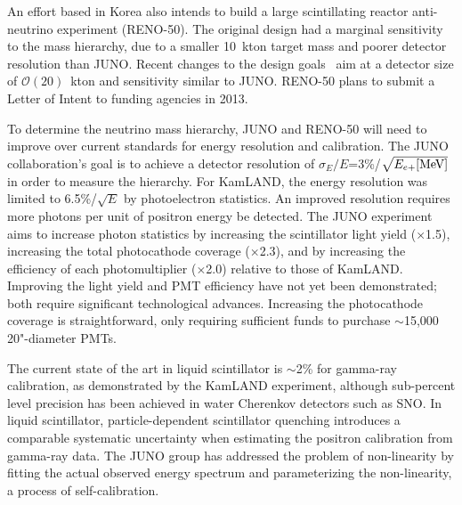 An effort based in Korea also intends to build a large scintillating
reactor anti-neutrino experiment (RENO-50). 
The original design had a marginal sensitivity to
the mass hierarchy, due to a smaller 10~kton target 
mass and poorer detector resolution than JUNO.  Recent changes to the
design goals~\cite{KimRENO} aim at a detector size of $\mathcal{O}(20)$~kton and sensitivity
similar to JUNO. RENO-50 plans to submit a Letter of Intent to funding
agencies in 2013.  

To determine the neutrino mass hierarchy, JUNO and RENO-50 will
need to improve over current standards for energy resolution and
calibration.  The JUNO collaboration's goal 
is to achieve a detector resolution of $\sigma_{E}/E$=3\%/$\sqrt{E_{e+}{\rm [MeV]}}$
in order to measure the hierarchy.  For
KamLAND, the energy resolution was limited to 6.5\%/$\sqrt{E}$ by
photoelectron statistics.  An improved resolution requires more
photons per unit of positron energy be detected.  The JUNO
experiment aims to increase photon statistics by increasing the
scintillator light yield ($\times$1.5), increasing the total
photocathode coverage ($\times$2.3), and by increasing the
efficiency of each photomultiplier ($\times$2.0) relative to those of KamLAND.
Improving the light yield and PMT efficiency have not yet been
demonstrated; both require significant technological advances.
Increasing the photocathode coverage is straightforward, only
requiring sufficient funds to purchase $\sim$15,000 20"-diameter PMTs.

The current state of the art in liquid scintillator is $\sim$2\% for gamma-ray calibration, as
demonstrated by the KamLAND experiment, although sub-percent level precision has been achieved in water Cherenkov detectors such as SNO.  
In liquid scintillator, particle-dependent scintillator quenching introduces a comparable
systematic uncertainty when estimating the positron calibration from
gamma-ray data.  The JUNO group has addressed the problem of non-linearity by fitting the actual observed energy spectrum and parameterizing the non-linearity, a process of self-calibration.

